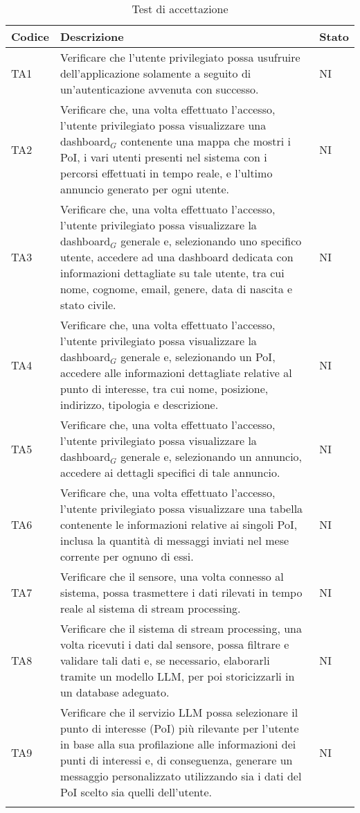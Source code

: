 \documentclass[10pt]{article}
\begin{document}
\begin{justify}
\begin{longtable}{|>{\centering\arraybackslash}m{2cm}|>{\centering\arraybackslash}m{7cm}|>{\centering\arraybackslash}m{2cm}|}
\hline
\textbf{Codice} & \textbf{Descrizione} & \textbf{Stato}\\
\endhead
\hline
TA1 & Verificare che l'utente privilegiato possa usufruire dell'applicazione solamente a seguito di un'autenticazione avvenuta con successo. & NI \\
\hline
TA2 & Verificare che, una volta effettuato l'accesso, l'utente privilegiato possa visualizzare una dashboard$_G$ contenente una mappa che mostri i PoI, i vari utenti presenti nel sistema con i percorsi effettuati in tempo reale, e l'ultimo annuncio generato per ogni utente. & NI \\
\hline
TA3 & Verificare che, una volta effettuato l'accesso, l'utente privilegiato possa visualizzare la dashboard$_G$ generale e, selezionando uno specifico utente, accedere ad una dashboard dedicata con informazioni dettagliate su tale utente, tra cui nome, cognome, email, genere, data di nascita e stato civile. & NI \\
\hline
TA4 & Verificare che, una volta effettuato l'accesso, l'utente privilegiato possa visualizzare la dashboard$_G$ generale e, selezionando un PoI, accedere alle informazioni dettagliate relative al punto di interesse, tra cui nome, posizione, indirizzo, tipologia e descrizione. & NI \\
\hline
TA5 & Verificare che, una volta effettuato l'accesso, l'utente privilegiato possa visualizzare la dashboard$_G$ generale e, selezionando un annuncio, accedere ai dettagli specifici di tale annuncio. & NI \\
\hline
TA6 & Verificare che, una volta effettuato l'accesso, l'utente privilegiato possa visualizzare una tabella contenente le informazioni relative ai singoli PoI, inclusa la quantità di messaggi inviati nel mese corrente per ognuno di essi. & NI \\
\hline
TA7 & Verificare che il sensore, una volta connesso al sistema, possa trasmettere i dati rilevati in tempo reale al sistema di stream processing. & NI \\
\hline
TA8 & Verificare che il sistema di stream processing, una volta ricevuti i dati dal sensore, possa filtrare e validare tali dati e, se necessario, elaborarli tramite un modello LLM, per poi storicizzarli in un database adeguato. & NI \\
\hline
TA9 & Verificare che il servizio LLM possa selezionare il punto di interesse (PoI) più rilevante per l'utente in base alla sua profilazione alle informazioni dei punti di interessi e, di conseguenza, generare un messaggio personalizzato utilizzando sia i dati del PoI scelto sia quelli dell'utente. & NI \\
\hline
\caption{Test di accettazione}\\
\end{longtable}



\end{justify}
\end{document}
